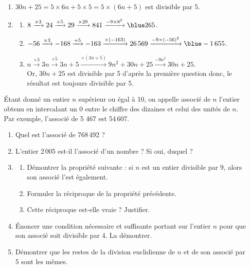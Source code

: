 \begin{corrige}
\ \\ [-5mm]
   \begin{enumerate}
      \item $30n+25 =5\times6n+5\times5 =5\times(6n+5)$ est {\blue divisible par 5}.
      \item 
         \begin{enumerate}
            \item $8 \xrightarrow{\times3} 24 \xrightarrow{+5} 29 \xrightarrow{\times29} 841 \xrightarrow{-9\times8^2} {\blue 265}$.
            \item $-56 \xrightarrow{\times3} -168 \xrightarrow{+5} -163 \xrightarrow{\times(-163)} 26\,569 \xrightarrow{-9\times(-56)^2} {\blue -1\,655}$.
            \item $n \xrightarrow{\times3} 3n \xrightarrow{+5} 3n+5 \xrightarrow{\times(3n+5)} 9n^2+30n+25 \xrightarrow{-9n^2} 30n+25$. \\
               Or, $30n+25$ est divisible par 5 d'après la première question donc, {\blue le résultat est toujours divisible par 5}.
         \end{enumerate}
   \end{enumerate}
\end{corrige}




\begin{exercice} %
   Étant donné un entier $n$ supérieur ou égal à 10, on appelle associé de $n$ l'entier obtenu en intercalant un 0 entre le chiffre des dizaines et celui des unités de $n$. Par exemple, l'associé de 5 467 est 54\,607.
   \begin{enumerate}
      \item Quel est l'associé de 768\,492 ?
      \item L'entier 2\,005 est-il l'associé d'un nombre ? Si oui, duquel ?
      \item
         \begin{enumerate}
            \item Démontrer la propriété suivante : si $n$ est un entier divisible par 9, alors son associé l'est également.
            \item Formuler la réciproque de la propriété précédente.
            \item Cette réciproque est-elle vraie ? Justifier.
         \end{enumerate}
      \item Énoncer une condition nécessaire et suffisante portant sur l'entier $n$ pour que son associé soit divisible par 4. La démontrer.
      \item Démontrer que les restes de la division euclidienne de $n$ et de son associé par 5 sont les mêmes.
   \end{enumerate}
\end{exercice}

